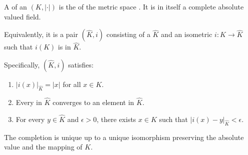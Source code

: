 \begin{definition} \label{definition:completion_of_an_absolute_valued_field}
A  of an  $(K, |\cdot|)$ is the  of the metric space . It is in itself a complete absolute valued field.

Equivalently, it is a pair $(\widehat{K}, i)$ consisting of a  $\widehat{K}$ and an isometric  $i: K \to \widehat{K}$ such that $i(K)$ is  in $\widehat{K}$. 

Specifically, $(\widehat{K}, i)$ satisfies:
\begin{enumerate}
    \item $|i(x)|_{\widehat{K}} = |x|$ for all $x \in K$.
    \item Every  in $\widehat{K}$ converges to an element in $\widehat{K}$.
    \item For every $y \in \widehat{K}$ and $\epsilon > 0$, there exists $x \in K$ such that $|i(x) - y|_{\widehat{K}} < \epsilon$.
\end{enumerate}
The completion is unique up to a unique isomorphism preserving the absolute value and the mapping of $K$.
\end{definition}